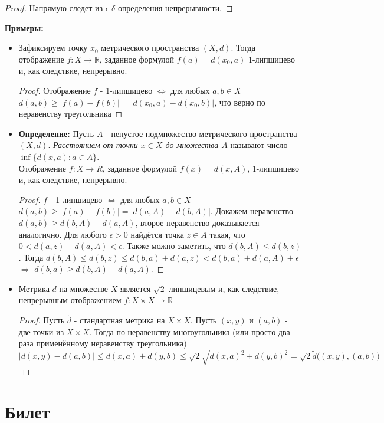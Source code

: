\documentclass[a4paper,100pt]{article}
\theoremstyle{indented}
\begin{document}
\begin{proof}
Напрямую следет из $\epsilon$-$\delta$ определения непрерывности.
\end{proof}
\textbf{Примеры:}
\begin{itemize}
    \item Зафиксируем точку $x_0$ метрического пространства $(X, d)$. Тогда отображение $f: X \rightarrow \mathbb{R}$, заданное формулой $f(a)=d(x_0, a)$ 1-липшицево и, как следствие, непрерывно.
    \begin{proof}
    Отображение $f$ -  1-липшицево $\Longleftrightarrow$ для любых $a, b \in X$ $d(a, b) \geq |f(a)-f(b)| = |d(x_0, a)-d(x_0, b)|$, что верно по неравенству треугольника
    \end{proof}
    \item \textbf{Определение:} Пусть $A$ - непустое подмножество метрического пространства $(X, d)$. \textit{Расстоянием от точки $x \in X$ до множества $A$} называют число $\inf \{d(x, a) : a \in A \}$.
    \\ Отображение $f: X \rightarrow R$, заданное формулой $f(x)=d(x, A)$, 1-липшицево и, как следствие, непрерывно.
    \begin{proof}
    $f$ - 1-липшицево $\Longleftrightarrow$ для любых $a, b \in X$ $d(a, b) \geq |f(a)-f(b)|=|d(a, A)-d(b, A)|$. Докажем неравенство $d(a, b) \geq d(b, A)-d(a, A)$, второе неравенство доказывается аналогично. Для любого $\epsilon > 0$ найдётся точка $z \in A$ такая, что $0<d(a, z)-d(a, A) < \epsilon$. Также можно заметить, что $d(b, A) \leq d(b, z)$. Тогда $d(b, A) \leq d(b, z) \leq d(b, a)+d(a, z) < d(b, a)+d(a, A)+\epsilon$ $\Longrightarrow$ $d(b, a) \geq d(b, A)-d(a, A)$.
    \end{proof}
    \item Метрика $d$ на множестве $X$ является $\sqrt{2}$-липшицевым и, как следствие, непрерывным отображением $f: X \times X \rightarrow \mathbb{R}$
    \begin{proof}
    Пусть $\widetilde{d}$ - стандартная метрика на $X \times X$. Пусть $(x, y)$ и $(a, b)$ - две точки из $X \times X$. Тогда по неравенству многоугольника (или просто два раза применённому неравенству треугольника) $|d(x, y)-d(a, b)| \leq d(x, a)+d(y, b) \leq \sqrt{2} \sqrt{d(x, a)^2+d(y, b)^2}=\sqrt{2} \widetilde{d}\big ((x, y), (a, b) \big)$
    \end{proof}
\end{itemize}

\section{Билет} \
\end{document}
